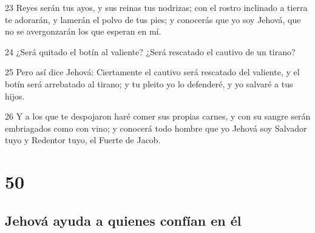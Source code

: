 \par 23 Reyes serán tus ayos, y sus reinas tus nodrizas; con el rostro inclinado a tierra te adorarán, y lamerán el polvo de tus pies; y conocerás que yo soy Jehová, que no se avergonzarán los que esperan en mí.
\par 24 ¿Será quitado el botín al valiente? ¿Será rescatado el cautivo de un tirano?
\par 25 Pero así dice Jehová: Ciertamente el cautivo será rescatado del valiente, y el botín será arrebatado al tirano; y tu pleito yo lo defenderé, y yo salvaré a tus hijos.
\par 26 Y a los que te despojaron haré comer sus propias carnes, y con su sangre serán embriagados como con vino; y conocerá todo hombre que yo Jehová soy Salvador tuyo y Redentor tuyo, el Fuerte de Jacob.

\chapter{50}

\section*{Jehová ayuda a quienes confían en él}


